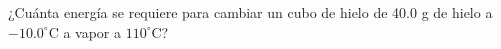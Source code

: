 \item ¿Cuánta energía se requiere para cambiar un cubo de hielo de 40.0 g de hielo a $-10.0^\circ\text{C}$ a vapor a $110^\circ\text{C}$?
